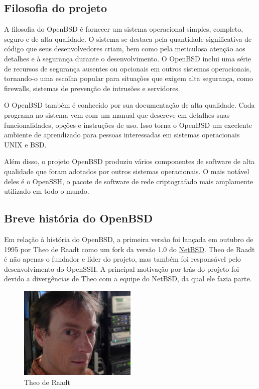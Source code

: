 \documentclass[a4paper,10pt]{article}
\begin{document}
\subsection{Filosofia do projeto}
A filosofia do OpenBSD é fornecer um sistema operacional simples, completo, seguro e de alta qualidade. O sistema se destaca pela quantidade significativa de código que seus desenvolvedores criam, bem como pela meticulosa atenção aos detalhes e à segurança durante o desenvolvimento. O OpenBSD inclui uma série de recursos de segurança ausentes ou opcionais em outros sistemas operacionais, tornando-o uma escolha popular para situações que exigem alta segurança, como firewalls, sistemas de prevenção de intrusões e servidores.

O OpenBSD também é conhecido por sua documentação de alta qualidade. Cada programa no sistema vem com um manual que descreve em detalhes suas funcionalidades, opções e instruções de uso. Isso torna o OpenBSD um excelente ambiente de aprendizado para pessoas interessadas em sistemas operacionais UNIX e BSD.

Além disso, o projeto OpenBSD produziu vários componentes de software de alta qualidade que foram adotados por outros sistemas operacionais. O mais notável deles é o OpenSSH, o pacote de software de rede criptografado mais amplamente utilizado em todo o mundo.

\subsection{Breve história do OpenBSD}

Em relação à história do OpenBSD, a primeira versão foi lançada em outubro de 1995 por Theo de Raadt como um fork da versão 1.0 do \href{https://www.netbsd.org/}{NetBSD}. Theo de Raadt é não apenas o fundador e líder do projeto, mas também foi responsável pelo desenvolvimento do OpenSSH. A principal motivação por trás do projeto foi devido a divergências de Theo com a equipe do NetBSD, da qual ele fazia parte.

\begin{figure}[!ht]
    \centering
    \includegraphics[width=0.5\textwidth]{imagens/thao-de-raadt.jpg}
    \caption{Theo de Raadt}
\end{figure}
\end{document}
